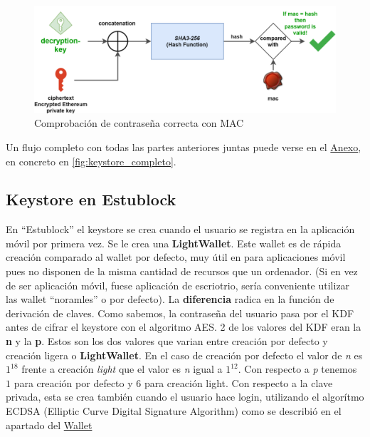 \begin{figure}[h!]
  \centering
  \includegraphics[width=0.8\linewidth]{figs/Desarrollo/Keystore/keystore_MAC}
  \caption[Comprobación de contraseña correcta con MAC]{Comprobación de contraseña correcta con MAC}
  \label{fig:keystore_MAC}
\end{figure}

Un flujo completo con todas las partes anteriores juntas puede verse en el \hyperref[cap:Anexo]{Anexo}, en concreto en \ref{fig:keystore_completo}.

\subsection{Keystore en Estublock}

En ``Estublock'' el keystore se crea cuando el usuario se registra en la aplicación móvil por primera vez. Se le crea una \textbf{LightWallet}. Este wallet es de rápida creación comparado al wallet por defecto, muy útil en para aplicaciones móvil pues no disponen de la misma cantidad de recursos que un ordenador. (Si en vez de ser aplicación móvil, fuese aplicación de escriotrio, sería conveniente utilizar las wallet ``noramles'' o por defecto). La \textbf{diferencia} radica en la función de derivación de claves. Como sabemos, la contraseña del usuario pasa por el KDF antes de cifrar el keystore con el algoritmo AES. 2 de los valores del KDF eran la \textbf{n} y la \textbf{p}. Estos son los dos valores que varian entre creación por defecto y creación ligera o \textbf{LightWallet}. En el caso de creación por defecto el valor de \emph{n} es $1^18$ frente a creación \emph{light} que el valor es \emph{n} igual a $1^12$. Con respecto a \emph{p} tenemos $1$ para creación por defecto y 6 para creación light. Con respecto a la clave privada, esta se crea también cuando el usuario hace login, utilizando el algorítmo ECDSA (Elliptic Curve Digital Signature Algorithm) como se describió en el apartado del \hyperref[sec:wallet]{Wallet} \\

